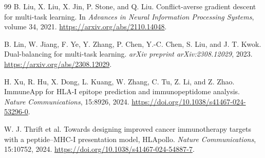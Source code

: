 \begin{thebibliography}{99}
B. Liu, X. Liu, X. Jin, P. Stone, and Q. Liu.
\newblock Conflict-averse gradient descent for multi-task learning.
\newblock In \emph{Advances in Neural Information Processing Systems}, volume 34, 2021.
\newblock \url{https://arxiv.org/abs/2110.14048}.

B. Lin, W. Jiang, F. Ye, Y. Zhang, P. Chen, Y.-C. Chen, S. Liu, and J. T. Kwok.
\newblock Dual-balancing for multi-task learning.
\newblock \emph{arXiv preprint arXiv:2308.12029}, 2023.
\newblock \url{https://arxiv.org/abs/2308.12029}.

H. Xu, R. Hu, X. Dong, L. Kuang, W. Zhang, C. Tu, Z. Li, and Z. Zhao.
\newblock ImmuneApp for HLA-I epitope prediction and immunopeptidome analysis.
\newblock \emph{Nature Communications}, 15:8926, 2024.
\newblock \url{https://doi.org/10.1038/s41467-024-53296-0}.

W. J. Thrift et al.
\newblock Towards designing improved cancer immunotherapy targets with a peptide--MHC-I presentation model, HLApollo.
\newblock \emph{Nature Communications}, 15:10752, 2024.
\newblock \url{https://doi.org/10.1038/s41467-024-54887-7}.

\end{thebibliography}
\endgroup
